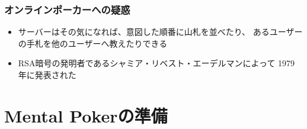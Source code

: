 \begin{frame}
  \frametitle{オンラインポーカーへの疑惑}
  

  \pause
  \begin{itemize}
    \item<+-> サーバーはその気になれば、意図した順番に山札を並べたり、
    あるユーザーの手札を他のユーザーへ教えたりできる
  \end{itemize}
  


  \begin{itemize}
    \item<+-> RSA暗号の発明者であるシャミア・リベスト・エーデルマンによって
    1979年に発表された
  \end{itemize}

\end{frame}

\section{Mental Pokerの準備}

